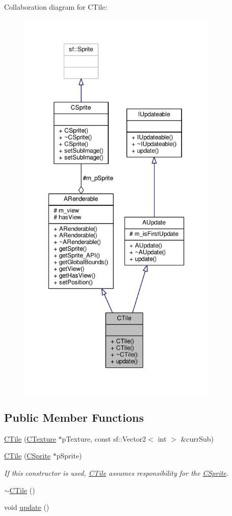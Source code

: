 Collaboration diagram for C\-Tile\-:\nopagebreak
\begin{figure}[H]
\begin{center}
\leavevmode
\includegraphics[height=550pt]{classCTile__coll__graph}
\end{center}
\end{figure}
\subsection*{Public Member Functions}
\begin{DoxyCompactItemize}
\item 
\hyperlink{classCTile_a030eef2d18fb054c0fa6738784af0b0d}{C\-Tile} (\hyperlink{classCTexture}{C\-Texture} $\ast$p\-Texture, const sf\-::\-Vector2$<$ int $>$ \&curr\-Sub)
\item 
\hyperlink{classCTile_a07c38be9c331480eb7c8d526b084a287}{C\-Tile} (\hyperlink{classCSprite}{C\-Sprite} $\ast$p\-Sprite)
\begin{DoxyCompactList}\small\item\em If this constructor is used, \hyperlink{classCTile}{C\-Tile} assumes responsibility for the \hyperlink{classCSprite}{C\-Sprite}. \end{DoxyCompactList}\item 
\hyperlink{classCTile_ac57f4f936e612edf8fc825d91912640a}{$\sim$\-C\-Tile} ()
\item 
void \hyperlink{classCTile_a818a17e48a7219eedac950b82c641ee0}{update} ()
\end{DoxyCompactItemize}
